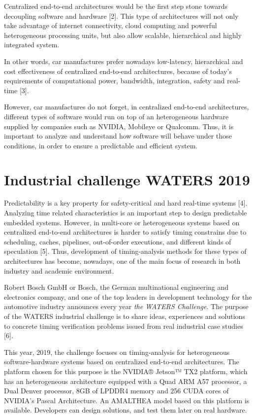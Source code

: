 \documentclass[
  12pt,
  a4paperpaper,
]{report}
\begin{document}
Centralized end-to-end architectures would be the first step stone
towards decoupling software and hardware {[}2{]}. This type of
architectures will not only take advantage of internet connectivity,
cloud computing and powerful heterogeneous processing units, but also
allow scalable, hierarchical and highly integrated system.

In other words, car manufactures prefer nowadays low-latency,
hierarchical and cost effectiveness of centralized end-to-end
architectures, because of today's requirements of computational power,
bandwidth, integration, safety and real-time {[}3{]}.

However, car manufactures do not forget, in centralized
end-to-end architectures, different types of software would run on top
of an heterogeneous hardware supplied by companies such as NVIDIA,
Mobileye or Qualcomm. Thus, it is important to analyze and understand how
software will behave under those conditions, in order to ensure a
predictable and efficient system.

\hypertarget{industrial-challenge-waters-2019}{%
\section{Industrial challenge WATERS
2019}\label{industrial-challenge-waters-2019}}

Predictability is a key property for safety-critical and hard real-time
systems {[}4{]}. Analyzing time related characteristics is an important
step to design predictable embedded systems. However, in multi-core or
heterogeneous systems based on centralized end-to-end architectures is
harder to satisfy timing constrains due to scheduling, caches,
pipelines, out-of-order executions, and different kinds of speculation
{[}5{]}. Thus, development of timing-analysis methods for these types of
architectures has become, nowadays, one of the main focus of research in
both industry and academic environment.

Robert Bosch GmbH or Bosch, the German multinational engineering and
electronics company, and one of the top leaders in development
technology for the automotive industry announces every year \emph{the
WATERS Challenge}. The purpose of the WATERS industrial challenge is to
share ideas, experiences and solutions to concrete timing verification
problems issued from real industrial case studies {[}6{]}.

This year, 2019, the challenge focuses on timing-analysis for
heterogeneous software-hardware systems based on centralized end-to-end
architectures. The platform chosen for this purpose is the NVIDIA®
Jetson™ TX2 platform, which has an heterogeneous architecture equipped
with a Quad ARM A57 processor, a Dual Denver processor, 8GB of LPDDR4
memory and 256 CUDA cores of NVIDIA's Pascal Architecture. 
An AMALTHEA model based on this platform is available. Developers can design
solutions, and test them later on real hardware.
\end{document}

